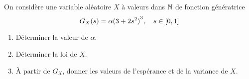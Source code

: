 \begin{td-exo}[] %
    On considère une variable aléatoire \(X\) à valeurs dans \(\mathbb{N}\)
    de fonction génératrice
    \begin{equation*}
        G_X(s) = \alpha {(3 + 2s^2)}^3, \quad s\in\mathopen{}\left[0,1\right]\mathclose{}
    \end{equation*}
    \begin{enumerate}
        \item Déterminer la valeur de \(\alpha\).

        \item Déterminer la loi de \(X\).

        \item À partir de \(G_X\), donner les valeurs de
        l'espérance et de la variance de \(X\).
    \end{enumerate}
\end{td-exo}
